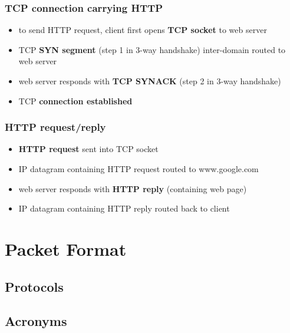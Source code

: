 \documentclass[12pt, a4paper]{article}
\begin{document}
\begin{multicols*}{2}
	\subsubsection{TCP connection carrying HTTP}
	\begin{itemize}
		\item to send HTTP request, client first opens \textbf{TCP socket} to web server
		\item TCP \textbf{SYN segment} (step 1 in 3-way handshake) inter-domain routed to web server
		\item web server responds with \textbf{TCP SYNACK} (step 2 in 3-way handshake)
		\item TCP \textbf{connection established}
	\end{itemize}
	\subsubsection{HTTP request/reply}
	\begin{itemize}
		\item \textbf{HTTP request} sent into TCP socket
		\item IP datagram containing HTTP request routed to www.google.com
		\item web server responds with \textbf{HTTP reply} (containing web page)
		\item IP datagram containing HTTP reply routed back to client
	\end{itemize}
	
\end{multicols*}	
	
	\newpage
	\section{Packet Format}
	
	
	\newpage
	\begin{multicols*}{2}
		\section{Protocols}
		
	\end{multicols*}
	
	\newpage
	\begin{multicols*}{2}
	\section{Acronyms}
	
\end{multicols*}
\end{document}
